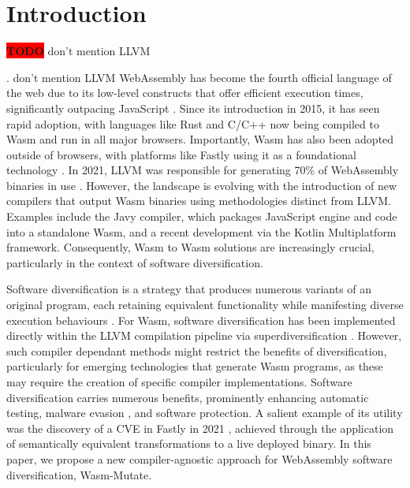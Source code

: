 \documentclass[sigplan,screen]{acmart}
\newcommand*\badge[1]{ \colorbox{red}{\color{white}#1}}
\newcommand{\tool}{{\sc Wasm-Mutate}\xspace}
\newcommand{\wasm}{Wasm\xspace}
\newcommand{\Wasm}{WebAssembly\xspace}
\newcommand{\todo}[1]{%
\refstepcounter{todo}
\noindent\textbf{\badge{TODO}} {\color{red}#1}
\addcontentsline{td}{todo}
{\color{red}\thesection.\thetodo\xspace #1}}
\begin{document}

\section{Introduction}

\todo{don't mention LLVM}
\Wasm has become the fourth official language of the web due to its low-level constructs that offer efficient execution times, significantly outpacing JavaScript \cite{haas2017bringing, WebAssemblyCoreSpecification}. 
Since its introduction in 2015, it has seen rapid adoption, with languages like Rust and C/C++ now being compiled to \wasm and run in all major browsers. 
Importantly, \wasm has also been adopted outside of browsers, with platforms like Fastly using it as a foundational technology \cite{fastly}.
In 2021, LLVM was responsible for generating 70\% of \Wasm binaries in use \cite{hilbig2021empirical}. However, the landscape is evolving with the introduction of new compilers that output \wasm binaries using methodologies distinct from LLVM. 
Examples include the Javy compiler, which packages JavaScript engine and code into a standalone \wasm \cite{javy}, and a recent development via the Kotlin Multiplatform framework\cite{kmm}. 
Consequently, \wasm to \wasm solutions are increasingly crucial, particularly in the context of software diversification.

Software diversification is a strategy that produces numerous variants of an original program, each retaining equivalent functionality while manifesting diverse execution behaviours \cite{cohen1993operating}. 
For \wasm, software diversification has been implemented directly within the LLVM compilation pipeline via superdiversification \cite{arteaga2020crow, MEWE}. 
However, such compiler dependant methods might restrict the benefits of diversification, particularly for emerging technologies that generate \wasm programs, as these may require the creation of specific compiler implementations. 
Software diversification carries numerous benefits, prominently enhancing automatic testing, malware evasion \cite{CABRERAARTEAGA2023103296}, and software protection. 
A salient example of its utility was the discovery of a CVE in Fastly in 2021 \cite{CVE}, achieved through the application of semantically equivalent transformations to a live deployed binary.
In this paper, we propose a new compiler-agnostic approach for \Wasm software diversification, \tool.
\end{document}
